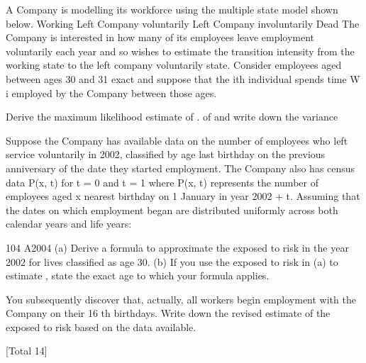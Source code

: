 \documentclass[a4paper,12pt]{article}
\begin{document}
A Company is modelling its workforce using the multiple state model shown below.
Working
Left Company
voluntarily
Left Company
involuntarily
Dead
The Company is interested in how many of its employees leave employment
voluntarily each year and so wishes to estimate the transition intensity from the
working state to the left company voluntarily state. Consider employees aged
between ages 30 and 31 exact and suppose that the ith individual spends time W i
employed by the Company between those ages.
\item  Derive the maximum likelihood estimate
of .
of
and write down the variance

\item  Suppose the Company has available data on the number of employees who left
service voluntarily in 2002, classified by age last birthday on the previous
anniversary of the date they started employment.
The Company also has census data P(x, t) for t = 0 and t = 1 where P(x, t)
represents the number of employees aged x nearest birthday on 1 January in
year 2002 + t.
Assuming that the dates on which employment began are distributed
uniformly across both calendar years and life years:
\item 
104 A2004
(a) Derive a formula to approximate the exposed to risk in the year 2002
for lives classified as age 30.
(b) If you use the exposed to risk in (a) to estimate , state the exact age to
which your formula applies.

You subsequently discover that, actually, all workers begin employment with
the Company on their 16 th birthdays. Write down the revised estimate of the
exposed to risk based on the data available.

[Total 14]
\end{document}
